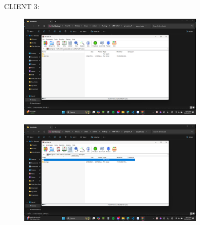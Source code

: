 \documentclass[a4paper]{article}
\begin{document}
\indent CLIENT 3:
\begin{figure}[H]
    \centering
    \includegraphics[width=0.8\textwidth]{images/34.png}
    \captionsetup{labelformat=empty}
\end{figure}
\begin{figure}[H]
    \centering
    \includegraphics[width=0.8\textwidth]{images/35.png}
    \captionsetup{labelformat=empty}
\end{figure}
\end{document}
